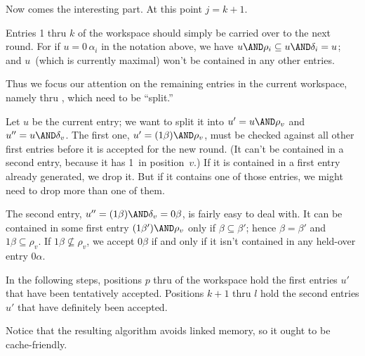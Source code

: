 Now comes the interesting part. At this point $j=k+1$.

Entries 1 thru $k$ of the workspace should simply be carried
over to the next round. For if $u=0\,\alpha_i$ in the notation above,
we have $u\AND\rho_i\subseteq u\AND\delta_i=u$; and $u$~(which is
currently maximal) won't be contained in any other entries.

Thus we focus our attention on the remaining entries in the current workspace,
namely  thru , which need to be ``split.''

Let $u$ be the current entry; we want to split it into
$u'=u\AND\rho_v$ and $u''=u\AND\delta_v$. The first one,
$u'=(1\beta)\AND\rho_v$, must be checked
against all other first entries before it is accepted for the
new round. (It can't be contained in a second entry, because it has 1~in
position~$v$.)
If it is contained in a first entry already generated, we drop it.
But if it contains one of those entries, we might need to drop
more than one of them.

The second entry, $u''=(1\beta)\AND\delta_v=0\beta$,
is fairly easy to deal with. It can be
contained in some first entry $(1\beta')\AND\rho_v$ only if
$\beta\subseteq\beta'$; hence $\beta=\beta'$ and $1\beta\subseteq\rho_v$.
If $1\beta\not\subseteq\rho_v$, we accept $0\beta$ if and only if it
isn't contained in any held-over entry $0\alpha$.

In the following steps, positions $p$ thru  of the
workspace
hold the first entries $u'$ that have been tentatively accepted.
Positions $k+1$ thru $l$ hold the second entries $u'$ that have
definitely been accepted.

Notice that the resulting algorithm avoids linked memory, so it
ought to be cache-friendly.

